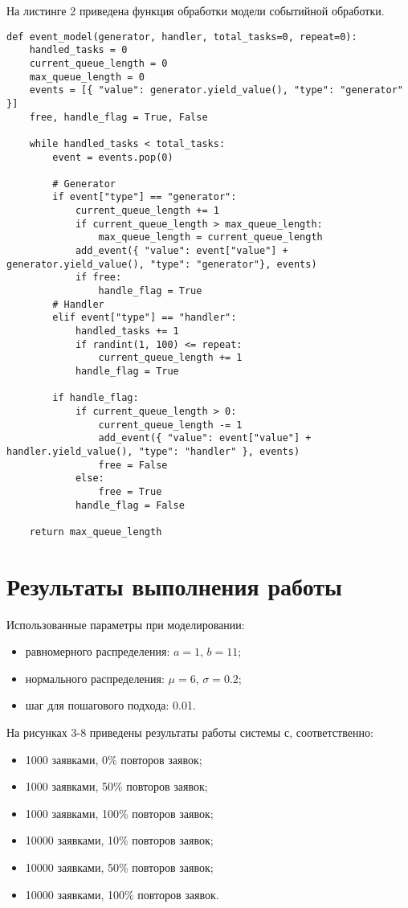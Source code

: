 На листинге 2 приведена функция обработки модели событийной обработки.
\begin{lstlisting}[label=CodeStand,caption=Реализация событийного подхода]
def event_model(generator, handler, total_tasks=0, repeat=0):
	handled_tasks = 0
	current_queue_length = 0
	max_queue_length = 0
	events = [{ "value": generator.yield_value(), "type": "generator" }]
	free, handle_flag = True, False
	
	while handled_tasks < total_tasks:
		event = events.pop(0)
		
		# Generator
		if event["type"] == "generator":
			current_queue_length += 1
			if current_queue_length > max_queue_length:
				max_queue_length = current_queue_length
			add_event({ "value": event["value"] + generator.yield_value(), "type": "generator"}, events)
			if free:
				handle_flag = True
		# Handler
		elif event["type"] == "handler":
			handled_tasks += 1
			if randint(1, 100) <= repeat:
				current_queue_length += 1
			handle_flag = True
		
		if handle_flag:
			if current_queue_length > 0:
				current_queue_length -= 1
				add_event({ "value": event["value"] + handler.yield_value(), "type": "handler" }, events)
				free = False
			else:
				free = True
			handle_flag = False
	
	return max_queue_length
\end{lstlisting}


\section*{Результаты выполнения работы}

Использованные параметры при моделировании:
\begin{itemize}
	\item равномерного распределения: $a = 1$, $b = 11$;
	\item нормального распределения: $\mu = 6$, $\sigma = 0.2$;
	\item шаг для пошагового подхода: 0.01.
\end{itemize}


На рисунках 3-8 приведены результаты работы системы с, соответственно:
\begin{itemize}
	\item 1000 заявками, 0\% повторов заявок;
	\item 1000 заявками, 50\% повторов заявок;
	\item 1000 заявками, 100\% повторов заявок;
	\item 10000 заявками, 10\% повторов заявок;
	\item 10000 заявками, 50\% повторов заявок;
	\item 10000 заявками, 100\% повторов заявок.
\end{itemize}

